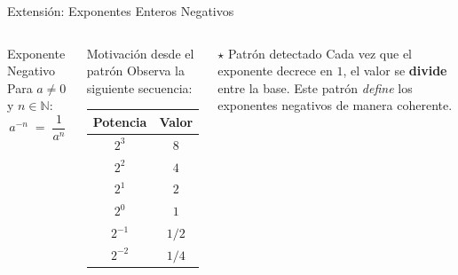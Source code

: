 \documentclass[12pt, aspectratio=169]{beamer}
\begin{document}
\begin{frame}{Extensión: Exponentes Enteros Negativos}
  \begin{columns}[T]
    \begin{definicion}{Exponente Negativo}
      Para $a \neq 0$ y $n \in \mathbb{N}$:
      \[
        a^{-n} \;=\; \frac{1}{a^n}
      \]
    \end{definicion}
    \vspace{4pt}
    \begin{block}{Motivación desde el patrón}
      Observa la siguiente secuencia:
      \medskip

      \renewcommand{\arraystretch}{1.4}
      \begin{tabular}{cc}
        \toprule
        Potencia & Valor \\
        \midrule
        $2^3$ & $8$ \\
        $2^2$ & $4$ \\
        $2^1$ & $2$ \\
        $2^0$ & $1$ \\
        $2^{-1}$ & $1/2$ \\
        $2^{-2}$ & $1/4$ \\
        \bottomrule
      \end{tabular}
    \end{block}

    \vspace{4pt}
    \begin{block}{$\star$\; Patrón detectado}
      \small Cada vez que el exponente decrece en $1$, el valor se \textbf{divide} entre la base. Este patrón \emph{define} los exponentes negativos de manera coherente.
    \end{block}
  \end{columns}
\end{frame}
\end{document}
